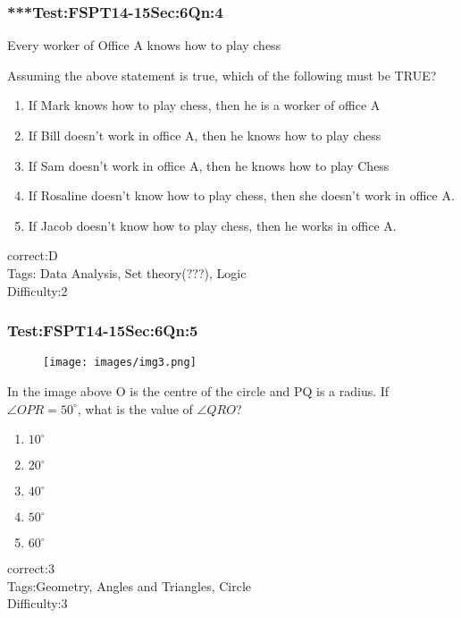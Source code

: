 \documentclass[]{beamer}
\begin{document}
    \begin{frame}
	    \frametitle{***Test:FSPT14-15\hspace{2mm}Sec:6\hspace{2mm}Qn:4}
	    \begin{center}
	    	Every worker of Office A knows how to play chess 
		\end{center}	       
		Assuming the above statement is true, which of the following must be TRUE?
	    \begin{enumerate}
	        \item
				If Mark knows how to play chess, then he is a worker of office A
	        \item
	            If Bill doesn't work in office A, then he knows how to play chess
	        \item
	            If Sam doesn't work in office A, then he knows how to play Chess
	        \item
	         	If Rosaline doesn't know how to play chess, then she doesn't work in office A.   
	        \item
	            If Jacob doesn't know how to play chess, then he works in office A. 
	    \end{enumerate}
	    correct:D  \\   
	    Tags: Data Analysis, Set theory(???), Logic    \\
	    Difficulty:2  \\
    \end{frame}
    \begin{frame}
	    \frametitle{Test:FSPT14-15\hspace{2mm}Sec:6\hspace{2mm}Qn:5}
	     \begin{figure}
	     	\begin{center}
	     		\texttt{[image: images/img3.png]}
	    	\end{center}
		\end{figure}
		In the image above O is the centre of the circle and PQ is a radius. If $\angle{OPR}=50^\circ$, what is the value of $\angle{QRO}$?       
	    \begin{enumerate}
	        \item
	           $10^\circ$ 	
	        \item
	           $20^\circ$ 
	        \item
	            $40^\circ$
	        \item
	            $50^\circ$
	        \item
	            $60^\circ$
	    \end{enumerate}
	    correct:3  \\   
	    Tags:Geometry, Angles and Triangles, Circle    \\
	    Difficulty:3   \\
    \end{frame}
\end{document}
